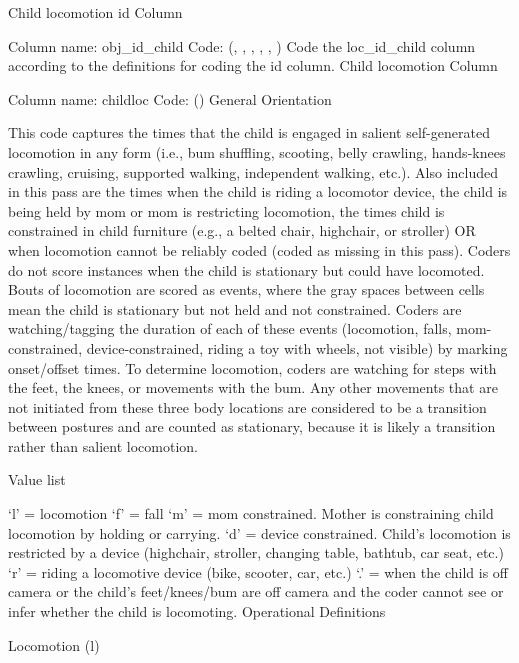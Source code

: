 \documentclass[
]{book}
\begin{document}
Child locomotion id Column

Column name: obj\_id\_child
Code: (, , , , , )
Code the loc\_id\_child column according to the definitions for coding the id column.
Child locomotion Column

Column name: childloc
Code: ()
General Orientation

This code captures the times that the child is engaged in salient self-generated locomotion in any form (i.e., bum shuffling, scooting, belly crawling, hands-knees crawling, cruising, supported walking, independent walking, etc.). Also included in this pass are the times when the child is riding a locomotor device, the child is being held by mom or mom is restricting locomotion, the times child is constrained in child furniture (e.g., a belted chair, highchair, or stroller) OR when locomotion cannot be reliably coded (coded as missing in this pass). Coders do not score instances when the child is stationary but could have locomoted. Bouts of locomotion are scored as events, where the gray spaces between cells mean the child is stationary but not held and not constrained.
Coders are watching/tagging the duration of each of these events (locomotion, falls, mom-constrained, device-constrained, riding a toy with wheels, not visible) by marking onset/offset times. To determine locomotion, coders are watching for steps with the feet, the knees, or movements with the bum. Any other movements that are not initiated from these three body locations are considered to be a transition between postures and are counted as stationary, because it is likely a transition rather than salient locomotion.

Value list

`l' = locomotion
`f' = fall
`m' = mom constrained. Mother is constraining child locomotion by holding or carrying.
`d' = device constrained. Child's locomotion is restricted by a device (highchair, stroller, changing table, bathtub, car seat, etc.)
`r' = riding a locomotive device (bike, scooter, car, etc.)
`.' = when the child is off camera or the child's feet/knees/bum are off camera and the coder cannot see or infer whether the child is locomoting.
Operational Definitions

Locomotion (l)
\end{document}

